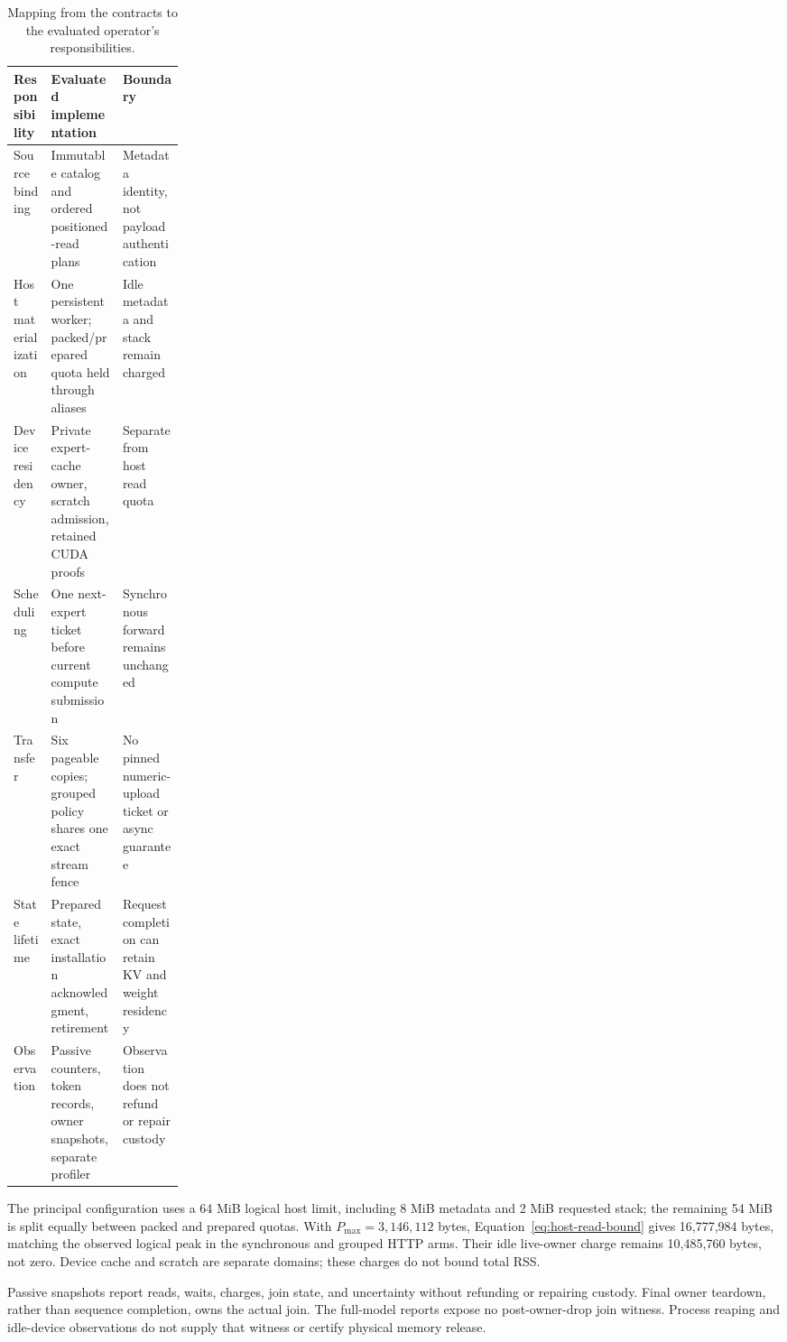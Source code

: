 \begin{table}[!htbp]
\centering
\small
\begin{tabularx}{\linewidth}{@{}p{0.22\linewidth}>{\raggedright\arraybackslash}X>{\raggedright\arraybackslash}X@{}}
\toprule
Responsibility & Evaluated implementation & Boundary \\
\midrule
Source binding & Immutable catalog and ordered positioned-read plans & Metadata identity, not payload authentication \\
Host materialization & One persistent worker; packed/prepared quota held through aliases & Idle metadata and stack remain charged \\
Device residency & Private expert-cache owner, scratch admission, retained CUDA proofs & Separate from host read quota \\
Scheduling & One next-expert ticket before current compute submission & Synchronous forward remains unchanged \\
Transfer & Six pageable copies; grouped policy shares one exact stream fence & No pinned numeric-upload ticket or async guarantee \\
State lifetime & Prepared state, exact installation acknowledgment, retirement & Request completion can retain KV and weight residency \\
Observation & Passive counters, token records, owner snapshots, separate profiler & Observation does not refund or repair custody \\
\bottomrule
\end{tabularx}
\caption{Mapping from the contracts to the evaluated operator's responsibilities.}
\label{tab:implementation-map}
\end{table}

The principal configuration uses a 64 MiB logical host limit, including
8 MiB metadata and 2 MiB requested stack; the remaining 54 MiB is split
equally between packed and prepared quotas. With $P_{\max}=3{,}146{,}112$
bytes, Equation~\ref{eq:host-read-bound} gives 16,777,984 bytes, matching the
observed logical peak in the synchronous and grouped HTTP arms. Their idle
live-owner charge remains 10,485,760 bytes, not zero. Device cache and scratch
are separate domains; these charges do not bound total RSS.

Passive snapshots report reads, waits, charges, join state, and uncertainty
without refunding or repairing custody. Final owner teardown, rather than
sequence completion, owns the actual join. The full-model reports expose no
post-owner-drop join witness. Process reaping and idle-device observations do
not supply that witness or certify physical memory release.

